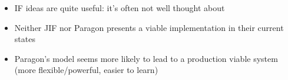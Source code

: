 \begin{itemize}
	\begin{itemize}
		\item IF ideas are quite useful: it's often not well thought about
		
		\item Neither JIF nor Paragon presents a viable implementation in their current states
		
		\item Paragon's model seems more likely to lead to a production viable system (more flexible/powerful, easier to learn)
	\end{itemize}
	
\end{itemize}